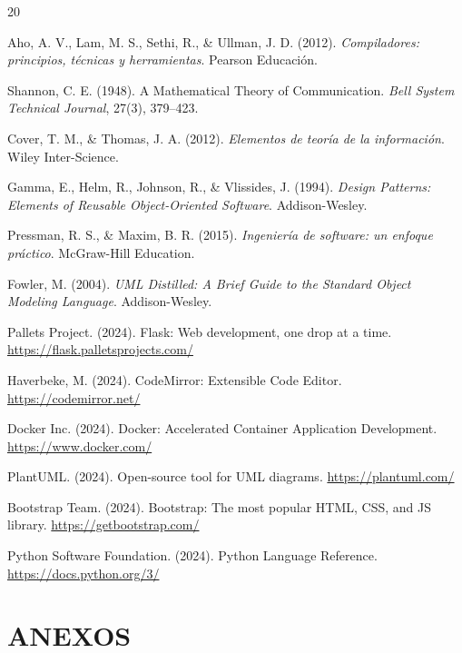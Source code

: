 \documentclass[12pt,a4paper]{article}
\begin{document}
\begin{thebibliography}{20}

Aho, A. V., Lam, M. S., Sethi, R., \& Ullman, J. D. (2012). \textit{Compiladores: principios, técnicas y herramientas}. Pearson Educación.

Shannon, C. E. (1948). A Mathematical Theory of Communication. \textit{Bell System Technical Journal}, 27(3), 379--423.

Cover, T. M., \& Thomas, J. A. (2012). \textit{Elementos de teoría de la información}. Wiley Inter-Science.

Gamma, E., Helm, R., Johnson, R., \& Vlissides, J. (1994). \textit{Design Patterns: Elements of Reusable Object-Oriented Software}. Addison-Wesley.

Pressman, R. S., \& Maxim, B. R. (2015). \textit{Ingeniería de software: un enfoque práctico}. McGraw-Hill Education.

Fowler, M. (2004). \textit{UML Distilled: A Brief Guide to the Standard Object Modeling Language}. Addison-Wesley.

Pallets Project. (2024). Flask: Web development, one drop at a time. \url{https://flask.palletsprojects.com/}

Haverbeke, M. (2024). CodeMirror: Extensible Code Editor. \url{https://codemirror.net/}

Docker Inc. (2024). Docker: Accelerated Container Application Development. \url{https://www.docker.com/}

PlantUML. (2024). Open-source tool for UML diagrams. \url{https://plantuml.com/}

Bootstrap Team. (2024). Bootstrap: The most popular HTML, CSS, and JS library. \url{https://getbootstrap.com/}

Python Software Foundation. (2024). Python Language Reference. \url{https://docs.python.org/3/}

\end{thebibliography}

\section{ANEXOS}
\end{document}
